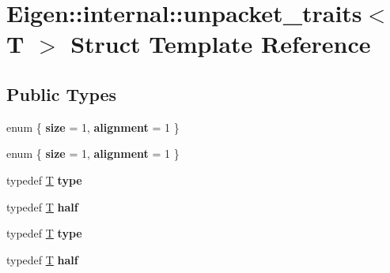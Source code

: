 \hypertarget{struct_eigen_1_1internal_1_1unpacket__traits}{}\section{Eigen\+:\+:internal\+:\+:unpacket\+\_\+traits$<$ T $>$ Struct Template Reference}
\label{struct_eigen_1_1internal_1_1unpacket__traits}
\subsection*{Public Types}
\begin{DoxyCompactItemize}
\item 
\mbox{\label{struct_eigen_1_1internal_1_1unpacket__traits_ac4ae3ea8a9870a37b80fcffb708f2d32}} 
enum \{ {\bfseries size} = 1, 
{\bfseries alignment} = 1
 \}
\item 
\mbox{\label{struct_eigen_1_1internal_1_1unpacket__traits_acbeec58ceabe8556365a435a592276af}} 
enum \{ {\bfseries size} = 1, 
{\bfseries alignment} = 1
 \}
\item 
\mbox{\label{struct_eigen_1_1internal_1_1unpacket__traits_a5ee5854983d337c190b4e8f12e32e03d}} 
typedef \hyperlink{group___sparse_core___module}{T} {\bfseries type}
\item 
\mbox{\label{struct_eigen_1_1internal_1_1unpacket__traits_a832cbd167bb00a6b31296cfe384b2f76}} 
typedef \hyperlink{group___sparse_core___module}{T} {\bfseries half}
\item 
\mbox{\label{struct_eigen_1_1internal_1_1unpacket__traits_a5ee5854983d337c190b4e8f12e32e03d}} 
typedef \hyperlink{group___sparse_core___module}{T} {\bfseries type}
\item 
\mbox{\label{struct_eigen_1_1internal_1_1unpacket__traits_a832cbd167bb00a6b31296cfe384b2f76}} 
typedef \hyperlink{group___sparse_core___module}{T} {\bfseries half}
\end{DoxyCompactItemize}


